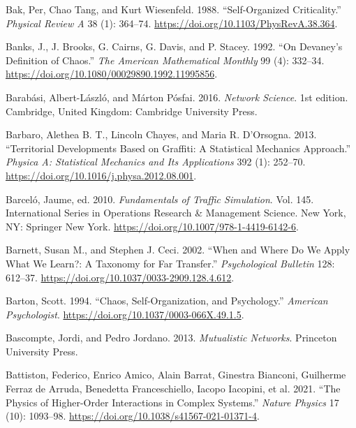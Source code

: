\documentclass[
  letterpaper,
]{scrbook}
\newlength{\cslhangindent}
\newlength{\cslentryspacingunit} %
\newenvironment{CSLReferences}[2] %
 {%
  \setlength{\parindent}{0pt}
  \ifodd #1
  \let\oldpar\par
  \def\par{\hangindent=\cslhangindent\oldpar}
  \fi
  \setlength{\parskip}{#2\cslentryspacingunit}
 }%
 {}
\begin{document}
\begin{CSLReferences}{1}{0}
\leavevmode{}%
Bak, Per, Chao Tang, and Kurt Wiesenfeld. 1988. {``Self-Organized
Criticality.''} \emph{Physical Review A} 38 (1): 364--74.
\url{https://doi.org/10.1103/PhysRevA.38.364}.

\leavevmode{}%
Banks, J., J. Brooks, G. Cairns, G. Davis, and P. Stacey. 1992. {``On
{Devaney}'s {Definition} of {Chaos}.''} \emph{The American Mathematical
Monthly} 99 (4): 332--34.
\url{https://doi.org/10.1080/00029890.1992.11995856}.

\leavevmode{}%
Barabási, Albert-László, and Márton Pósfai. 2016. \emph{Network
{Science}}. 1st edition. {Cambridge, United Kingdom}: {Cambridge
University Press}.

\leavevmode{}%
Barbaro, Alethea B. T., Lincoln Chayes, and Maria R. D'Orsogna. 2013.
{``Territorial Developments Based on Graffiti: {A} Statistical Mechanics
Approach.''} \emph{Physica A: Statistical Mechanics and Its
Applications} 392 (1): 252--70.
\url{https://doi.org/10.1016/j.physa.2012.08.001}.

\leavevmode{}%
Barceló, Jaume, ed. 2010. \emph{Fundamentals of {Traffic Simulation}}.
Vol. 145. International {Series} in {Operations Research} \& {Management
Science}. {New York, NY}: {Springer New York}.
\url{https://doi.org/10.1007/978-1-4419-6142-6}.

\leavevmode{}%
Barnett, Susan M., and Stephen J. Ceci. 2002. {``When and Where Do We
Apply What We Learn?: {A} Taxonomy for Far Transfer.''}
\emph{Psychological Bulletin} 128: 612--37.
\url{https://doi.org/10.1037/0033-2909.128.4.612}.

\leavevmode{}%
Barton, Scott. 1994. {``Chaos, {Self-Organization}, and {Psychology}.''}
\emph{American Psychologist}.
\url{https://doi.org/10.1037/0003-066X.49.1.5}.

\leavevmode{}%
Bascompte, Jordi, and Pedro Jordano. 2013. \emph{Mutualistic
{Networks}}. {Princeton University Press}.

\leavevmode{}%
Battiston, Federico, Enrico Amico, Alain Barrat, Ginestra Bianconi,
Guilherme Ferraz de Arruda, Benedetta Franceschiello, Iacopo Iacopini,
et al. 2021. {``The Physics of Higher-Order Interactions in Complex
Systems.''} \emph{Nature Physics} 17 (10): 1093--98.
\url{https://doi.org/10.1038/s41567-021-01371-4}.


\end{CSLReferences}
\end{document}
